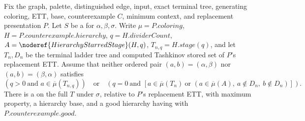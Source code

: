 \begin{lemma}
Fix the graph, palette, distinguished edge, input, exact terminal tree,
generating coloring, ETT, base, counterexample \(C\), minimum context,
and replacement presentation \(P\). Let \(S\) be a
 for \(\alpha,\beta,\sigma\).
Write \(\mu=P.\mathit{coloring}\), \(H=P.\mathit{counterexample.hierarchy}\),
\(q=H.\mathit{dividerCount}\), \(A=\noderef{HierarchyStarredStage}(H,q)\),
\(T_{n,q}=H.\mathit{stage}(q)\), and let \(T_n,D_n\) be the terminal
ladder tree and computed Tashkinov stored set of \(P\)'s replacement ETT.
Assume that neither ordered pair \((a,b)=(\alpha,\beta)\) nor
\((a,b)=(\beta,\alpha)\) satisfies
\[
 (q>0\ \text{and }a\in\overline\mu(T_{n,q}))
 \quad\text{or}\quad
 (q=0\ \text{and }[a\in\overline\mu(T_n)\ \text{or }
 (a\in\overline\mu(A),\ a\notin D_n,\ b\notin D_n)]).
\]
There is a  on the full
\(T\) under \(\sigma\), relative to \(P\)'s replacement ETT, with
maximum property, a hierarchy base, and a good hierarchy having
 with \(P.\mathit{counterexample.good}\).
\end{lemma}
